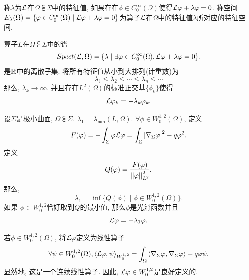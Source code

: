 \begin{definition}
    称$\lambda$为$\mathcal{L}$在$\Omega\subsub \Sigma$中的特征值, 如果存在$\phi \in C^\infty_0(\Omega)$使得$\mathcal{L} \varphi +\lambda \varphi =0$.  称空间$E_\lambda(\Omega)=\{\varphi \in C^\infty_0(\Omega)\mid \mathcal{L} \varphi + \lambda \varphi =0\}$为算子$\mathcal{L}$在$\Omega$中的特征值$\lambda$所对应的特征空间.
\end{definition}
\begin{theorem}
    算子$L$在$\Omega\subsub \Sigma$中的谱
    \begin{equation}
        Spect(\mathcal{L},\Omega)=\{\lambda\mid \exists \varphi\in C^\infty_0(\Omega), \mathcal{L} \varphi + \lambda \varphi =0\}.
    \end{equation}
    是$\mathbb{R}$中的离散子集.  将所有特征值从小到大排列(计重数)为
    \begin{equation}
        \lambda_1 \le \lambda_2 \le \cdots \le \lambda_n \le \cdots
    \end{equation}
    那么, $\lambda_k \to \infty$. 并且存在$L^2(\Omega)$的标准正交基$\{\phi_k\}$使得
    \begin{equation}
        \mathcal{L} \varphi_k =-\lambda_k \varphi_k.
    \end{equation}
\end{theorem}
\begin{theorem}\label{first_eigenvalue}
    设$\Sigma$是极小曲面, $\Omega \subsub \Sigma$. $\lambda_1=\lambda_{\min}(L,\Omega)$. $\forall \phi \in W^{1,2}_0(\Omega)$, 定义
    \begin{equation}
        F(\varphi)=-\int_\Sigma \varphi \mathcal{L} \varphi = \int_\Sigma \left | \nabla_\Sigma \varphi \right |^2-q\varphi^2.
    \end{equation}
    定义
    \begin{equation}
        Q(\varphi)=\frac{F(\varphi)}{{\left | \left | \varphi \right | \right |}_{L^2}^2}.
    \end{equation}
    那么,
    \begin{equation}
        \lambda_1=\inf \{Q(\phi)\mid \phi \in W^{1,2}_0(\Omega)\}.
    \end{equation}
    如果 $\phi\in W^{1,2}_0$恰好取到$Q$的最小值, 那么$\phi$是光滑函数并且 
    \begin{equation}
        \mathcal{L} \varphi = -\lambda_1 \varphi.
    \end{equation}
\end{theorem}
\begin{remark}
    若$\phi \in W^{1,2}_0(\Omega)$, 将$\mathcal{L}\varphi$定义为线性算子
    \begin{equation}
        \forall \psi \in W^{1,2}_0(\Omega), {\left < \mathcal{L}\varphi, \psi \right >}_{W^{1,2}_0}=\int_\Omega {\left < \nabla_\Sigma \varphi, \nabla_\Sigma \varphi\right >}-q\varphi\psi.
    \end{equation}
    显然地, 这是一个连续线性算子. 因此, $\mathcal{L}\varphi \in W^{1,2}_0$是良好定义的.
\end{remark}
